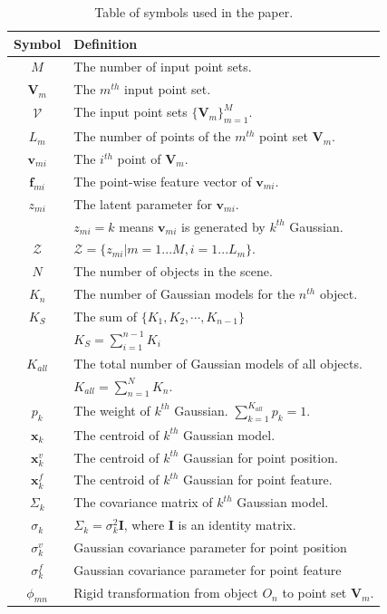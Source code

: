 \begin{table}[!hbp]
\centering
\caption{Table of symbols used in the paper.} 
\label{tab:symbol}
\begin{tabular}{c|l}
\hline
Symbol         & Definition\\
\hline
$M$            & The number of input point sets.\\
$\mathbf{V}_m$ & The $m^{th}$ input point set.\\
$\mathcal{V}$  & The input point sets $\{\mathbf{V}_m\}^{M}_{m=1}$.\\
$L_m$          & The number of points of the $m^{th}$ point set $\mathbf{V}_m$.\\
$\mathbf{v}_{mi}$ & The $i^{th}$ point of $\mathbf{V}_m$.\\
$\mathbf f_{mi}$   & The point-wise feature vector of $\mathbf v_{mi}$.\\
$z_{mi}$       & The latent parameter for $\mathbf v_{mi}$.\\
               & $z_{mi}=k$ means $\mathbf{v}_{mi}$ is generated by $k^{th}$ Gaussian. \\
$\mathcal{Z}$            & $\mathcal{Z}=\{z_{mi}|m=1...M,i=1...L_m\}$.\\
$N$            & The number of objects in the scene.\\
$K_n$          & The number of Gaussian models for the $n^{th}$ object. \\
$K_S$		   & The sum of $\{K_1,K_2,\cdots,K_{n-1}\}$\\
			   & $K_S = \sum_{i=1}^{n-1}K_i$\\
$K_{all}$      & The total number of Gaussian models of all objects. \\
               & $K_{all} = \sum_{n=1}^N K_n $.\\
$p_k$          & The weight of $k^{th}$ Gaussian. $\sum_{k=1}^{K_{all}}p_k=1$.\\
$\mathbf x_k$     & The centroid of $k^{th}$ Gaussian model.\\
$\mathbf {x}^{v}_k$   & The centroid of $k^{th}$ Gaussian for point position.\\
$\mathbf {x}^{f}_k$   & The centroid of $k^{th}$ Gaussian for point feature.\\
$\Sigma_k$     & The covariance matrix of $k^{th}$ Gaussian model.\\
$\sigma_k$     & $\Sigma_k=\sigma_k^2\mathbf{I}$, where $\mathbf{I}$ is an identity matrix.\\
$\sigma^v_k$   & Gaussian covariance parameter for point position\\
$\sigma^f_k$   & Gaussian covariance parameter for point feature\\
$\phi_{mn}$    & Rigid transformation from object $O_n$ to point set $\mathbf{V}_m$.\\
\hline
\end{tabular}
\end{table}




